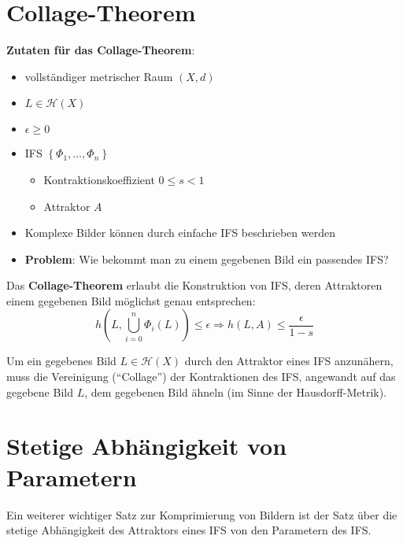 \documentclass[afourpaper]{latex-classes/handout}
\newcommand{\marginrule}{\makebox[\linewidth]{\rule{\linewidth}{0.4pt}}}
\begin{document}
\section{Collage-Theorem}

\begin{marginfigure}
  \textbf{Zutaten für das Collage-Theorem}:
  \begin{itemize}
    \item vollständiger metrischer Raum \( (X,d) \)
    \item \( L \in \mathcal{H}(X) \)
    \item \( \epsilon \geq 0 \)
    \item IFS \( \left \{ \Phi_1,\dots,\Phi_n \right \} \)
    \begin{itemize}
      \item Kontraktionskoeffizient \( 0 \leq s < 1 \) 
      \item Attraktor \( A \)
    \end{itemize}
  \end{itemize}
  \marginrule{}
\end{marginfigure}

\begin{itemize}
  \item Komplexe Bilder können durch einfache IFS beschrieben werden
  \item \textbf{Problem}: Wie bekommt man zu einem gegebenen Bild ein passendes IFS?\@
\end{itemize}

Das \textbf{Collage-Theorem} erlaubt die Konstruktion von IFS, deren Attraktoren einem gegebenen Bild möglichst genau entsprechen:
\begin{equation*}
  h\left( L,\bigcup_{i=0}^n \Phi_i(L) \right) \leq \epsilon \Rightarrow h(L,A) \leq \frac{\epsilon}{1 - s}
\end{equation*}

Um ein gegebenes Bild \( L \in \mathcal{H}(X) \) durch den Attraktor eines IFS anzunähern, muss die Vereinigung (``Collage'') der Kontraktionen des IFS, angewandt auf das gegebene Bild \( L \), dem gegebenen Bild ähneln (im Sinne der Hausdorff-Metrik).

\section{Stetige Abhängigkeit von Parametern}

Ein weiterer wichtiger Satz zur Komprimierung von Bildern ist der Satz über die stetige Abhängigkeit des Attraktors eines IFS von den Parametern des IFS.\@
\end{document}
